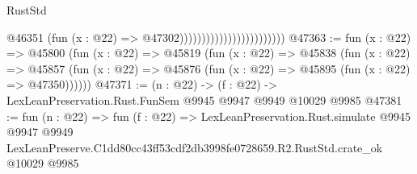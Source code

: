 \begin{lexlean}{RustStd}
\begin{coremodule}
                                                @46351
                                                  (fun (x : @22) => @47302))))))))))))))))))))))))
@47363 := fun (x : @22) =>
  @45800
    (fun (x : @22) =>
    @45819
      (fun (x : @22) =>
      @45838
        (fun (x : @22) =>
        @45857 (fun (x : @22) => @45876 (fun (x : @22) => @45895 (fun (x : @22) => @47350))))))
@47371 := (n : @22) -> (f : @22) -> LexLeanPreservation.Rust.FunSem @9945 @9947 @9949 @10029 @9985
@47381 := fun (n : @22) =>
  fun (f : @22) =>
  LexLeanPreservation.Rust.simulate
    @9945
    @9947
    @9949
    LexLeanPreserve.C1dd80cc43ff53cdf2db3998fe0728659.R2.RustStd.crate_ok
    @10029
    @9985
\end{coremodule}
\end{lexlean}

